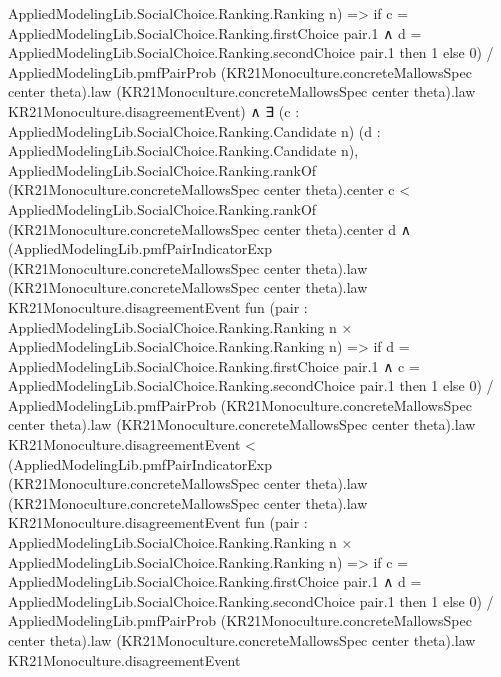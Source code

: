 \documentclass[10pt]{article}
\begin{document}
\begin{ReviewVerbatim}
                        AppliedModelingLib.SocialChoice.Ranking.Ranking n) =>
                  if
                      c = AppliedModelingLib.SocialChoice.Ranking.firstChoice pair.1 ∧
                        d = AppliedModelingLib.SocialChoice.Ranking.secondChoice pair.1 then
                    1
                  else 0) /
                AppliedModelingLib.pmfPairProb (KR21Monoculture.concreteMallowsSpec center theta).law
                  (KR21Monoculture.concreteMallowsSpec center theta).law KR21Monoculture.disagreementEvent) ∧
        ∃ (c : AppliedModelingLib.SocialChoice.Ranking.Candidate n) (d :
          AppliedModelingLib.SocialChoice.Ranking.Candidate n),
          AppliedModelingLib.SocialChoice.Ranking.rankOf (KR21Monoculture.concreteMallowsSpec center theta).center c <
              AppliedModelingLib.SocialChoice.Ranking.rankOf (KR21Monoculture.concreteMallowsSpec center theta).center
                d ∧
            (AppliedModelingLib.pmfPairIndicatorExp (KR21Monoculture.concreteMallowsSpec center theta).law
                  (KR21Monoculture.concreteMallowsSpec center theta).law KR21Monoculture.disagreementEvent
                  fun
                    (pair :
                      AppliedModelingLib.SocialChoice.Ranking.Ranking n ×
                        AppliedModelingLib.SocialChoice.Ranking.Ranking n) =>
                  if
                      d = AppliedModelingLib.SocialChoice.Ranking.firstChoice pair.1 ∧
                        c = AppliedModelingLib.SocialChoice.Ranking.secondChoice pair.1 then
                    1
                  else 0) /
                AppliedModelingLib.pmfPairProb (KR21Monoculture.concreteMallowsSpec center theta).law
                  (KR21Monoculture.concreteMallowsSpec center theta).law KR21Monoculture.disagreementEvent <
              (AppliedModelingLib.pmfPairIndicatorExp (KR21Monoculture.concreteMallowsSpec center theta).law
                  (KR21Monoculture.concreteMallowsSpec center theta).law KR21Monoculture.disagreementEvent
                  fun
                    (pair :
                      AppliedModelingLib.SocialChoice.Ranking.Ranking n ×
                        AppliedModelingLib.SocialChoice.Ranking.Ranking n) =>
                  if
                      c = AppliedModelingLib.SocialChoice.Ranking.firstChoice pair.1 ∧
                        d = AppliedModelingLib.SocialChoice.Ranking.secondChoice pair.1 then
                    1
                  else 0) /
                AppliedModelingLib.pmfPairProb (KR21Monoculture.concreteMallowsSpec center theta).law
                  (KR21Monoculture.concreteMallowsSpec center theta).law KR21Monoculture.disagreementEvent
\end{ReviewVerbatim}
\end{document}

